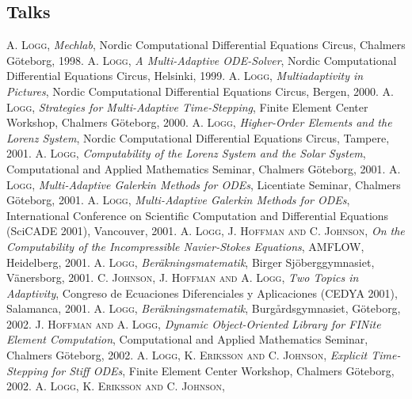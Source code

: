 \begin{thebibliography}{99}
\subsection*{Talks}
 {\textsc{A. Logg},
\textit{Mechlab},
Nordic Computational Differential Equations Circus, Chalmers G{\"o}teborg,
1998.
}
 {\textsc{A. Logg},
\textit{A Multi-Adaptive {ODE}-Solver},
Nordic Computational Differential Equations Circus, Helsinki,
1999.
}
 {\textsc{A. Logg},
\textit{Multiadaptivity in Pictures},
Nordic Computational Differential Equations Circus, Bergen,
2000.
}
 {\textsc{A. Logg},
\textit{Strategies for Multi-Adaptive Time-Stepping},
Finite Element Center Workshop, Chalmers G{\"o}teborg,
2000.
}
 {\textsc{A. Logg},
\textit{Higher-Order Elements and the {L}orenz System},
Nordic Computational Differential Equations Circus, Tampere,
2001.
}
 {\textsc{A. Logg},
\textit{Computability of the {L}orenz System and the Solar System},
Computational and Applied Mathematics Seminar, Chalmers G{\"o}teborg,
2001.
}
 {\textsc{A. Logg},
\textit{Multi-Adaptive {G}alerkin Methods for {ODE}s},
Licentiate Seminar, Chalmers G{\"o}teborg,
2001.
}
 {\textsc{A. Logg},
\textit{Multi-Adaptive {G}alerkin Methods for {ODE}s},
International Conference on Scientific Computation and Differential Equations (SciCADE 2001), Vancouver,
2001.
}
 {\textsc{A. Logg, J. Hoffman and C. Johnson},
\textit{On the Computability of the Incompressible Navier-Stokes Equations},
AMFLOW, Heidelberg,
2001.
}
 {\textsc{A. Logg},
\textit{Ber\"akningsmatematik},
Birger Sj{\"o}berggymnasiet, V\"anersborg,
2001.
}
 {\textsc{C. Johnson, J. Hoffman and A. Logg},
\textit{Two Topics in Adaptivity},
Congreso de Ecuaciones Diferenciales y Aplicaciones (CEDYA 2001), Salamanca,
2001.
}
 {\textsc{A. Logg},
\textit{Ber\"akningsmatematik},
Burg{\aa}rdsgymnasiet, G{\"o}teborg,
2002.
}
 {\textsc{J. Hoffman and A. Logg},
\textit{Dynamic Object-Oriented Library for FINite Element Computation},
Computational and Applied Mathematics Seminar, Chalmers G{\"o}teborg,
2002.
}
 {\textsc{A. Logg, K. Eriksson and C. Johnson},
\textit{Explicit Time-Stepping for Stiff {ODE}s},
Finite Element Center Workshop, Chalmers G{\"o}teborg,
2002.
}
 {\textsc{A. Logg, K. Eriksson and C. Johnson},
}
\end{thebibliography}
